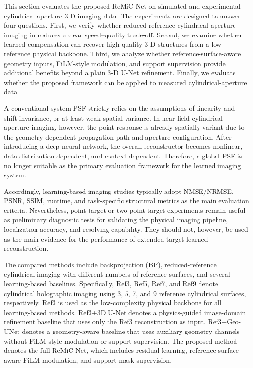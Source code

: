 \documentclass[journal]{IEEEtran}
\begin{document}
This section evaluates the proposed ReMiC-Net on simulated and experimental cylindrical-aperture 3-D imaging data. The experiments are designed to answer four questions. First, we verify whether reduced-reference cylindrical aperture imaging introduces a clear speed--quality trade-off. Second, we examine whether learned compensation can recover high-quality 3-D structures from a low-reference physical backbone. Third, we analyze whether reference-surface-aware geometry inputs, FiLM-style modulation, and support supervision provide additional benefits beyond a plain 3-D U-Net refinement. Finally, we evaluate whether the proposed framework can be applied to measured cylindrical-aperture data.

A conventional system PSF strictly relies on the assumptions of linearity and shift invariance, or at least weak spatial variance. In near-field cylindrical-aperture imaging, however, the point response is already spatially variant due to the geometry-dependent propagation path and aperture configuration. After introducing a deep neural network, the overall reconstructor becomes nonlinear, data-distribution-dependent, and context-dependent. Therefore, a global PSF is no longer suitable as the primary evaluation framework for the learned imaging system.

Accordingly, learning-based imaging studies typically adopt NMSE/NRMSE, PSNR, SSIM, runtime, and task-specific structural metrics as the main evaluation criteria. Nevertheless, point-target or two-point-target experiments remain useful as preliminary diagnostic tests for validating the physical imaging pipeline, localization accuracy, and resolving capability. They should not, however, be used as the main evidence for the performance of extended-target learned reconstruction.

The compared methods include backprojection (BP), reduced-reference cylindrical imaging with different numbers of reference surfaces, and several learning-based baselines. Specifically, Ref3, Ref5, Ref7, and Ref9 denote cylindrical holographic imaging using 3, 5, 7, and 9 reference cylindrical surfaces, respectively. Ref3 is used as the low-complexity physical backbone for all learning-based methods. Ref3+3D U-Net denotes a physics-guided image-domain refinement baseline that uses only the Ref3 reconstruction as input. Ref3+Geo-UNet denotes a geometry-aware baseline that uses auxiliary geometry channels without FiLM-style modulation or support supervision. The proposed method denotes the full ReMiC-Net, which includes residual learning, reference-surface-aware FiLM modulation, and support-mask supervision.
\end{document}
